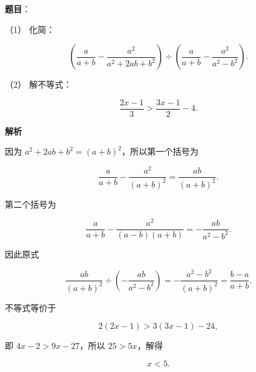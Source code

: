 \begin{answer}

\textbf{题目}：

（1） 化简：

\nopagebreak[4]
\[
\left(\frac{a}{a+b}-\frac{a^2}{a^2+2ab+b^2}\right)\div\left(\frac{a}{a+b}-\frac{a^2}{a^2-b^2}\right).
\]

（2） 解不等式：

\nopagebreak[4]
\[
\frac{2x-1}{3}>\frac{3x-1}{2}-4.
\]

\textbf{解析}


因为 $a^2+2ab+b^2=(a+b)^2$，所以第一个括号为

\nopagebreak[4]
\[
\frac{a}{a+b}-\frac{a^2}{(a+b)^2}
=\frac{ab}{(a+b)^2}.
\]

第二个括号为

\nopagebreak[4]
\[
\frac{a}{a+b}-\frac{a^2}{(a-b)(a+b)}
=-\frac{ab}{a^2-b^2}.
\]

因此原式

\nopagebreak[4]
\[
\frac{ab}{(a+b)^2}\div\left(-\frac{ab}{a^2-b^2}\right)
=-\frac{a^2-b^2}{(a+b)^2}
=\frac{b-a}{a+b}.
\]


不等式等价于

\nopagebreak[4]
\[
2(2x-1)>3(3x-1)-24,
\]

即 $4x-2>9x-27$，所以 $25>5x$，解得

\nopagebreak[4]
\[
x<5.
\]



\end{answer}
